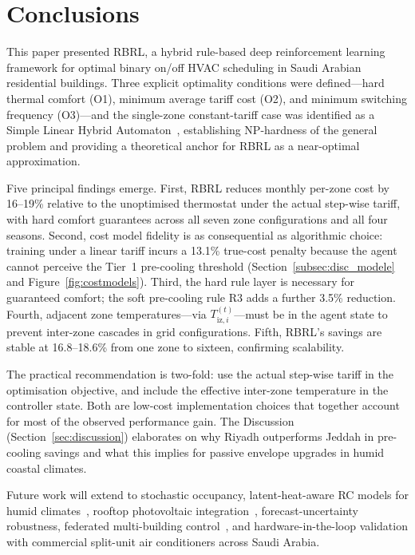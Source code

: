 \documentclass[12pt,a4paper]{article}
\let\oldsection\section
\renewcommand{\section}[1]{\FloatBarrier\oldsection{#1}}
\newcommand{\Tiz}[1]{T_{\mathrm{iz},#1}}
\begin{document}
\section{Conclusions}
\label{sec:conclusion}

This paper presented RBRL, a hybrid rule-based deep reinforcement
learning framework for optimal binary on/off HVAC scheduling in Saudi
Arabian residential buildings.
Three explicit optimality conditions were defined---hard thermal comfort
(O1), minimum average tariff cost (O2), and minimum switching frequency
(O3)---and the single-zone constant-tariff case was identified as a
Simple Linear Hybrid Automaton~\cite{Mousa2018}, establishing NP-hardness
of the general problem and providing a theoretical anchor for RBRL as a
near-optimal approximation.

Five principal findings emerge.
First, RBRL reduces monthly per-zone cost by 16--19\% relative to
the unoptimised thermostat under the actual step-wise tariff, with hard
comfort guarantees across all seven zone configurations and all four
seasons.
Second, cost model fidelity is as consequential as algorithmic choice:
training under a linear tariff incurs a 13.1\% true-cost penalty because
the agent cannot perceive the Tier~1 pre-cooling threshold
(Section~\ref{subsec:disc_modele} and Figure~\ref{fig:costmodels}).
Third, the hard rule layer is necessary for guaranteed comfort; the soft
pre-cooling rule R3 adds a further 3.5\% reduction.
Fourth, adjacent zone temperatures---via $\Tiz{i}^{(t)}$---must be in
the agent state to prevent inter-zone cascades in grid configurations.
Fifth, RBRL's savings are stable at 16.8--18.6\% from one zone to
sixteen, confirming scalability.

The practical recommendation is two-fold: use the actual step-wise
tariff in the optimisation objective, and include the effective
inter-zone temperature in the controller state.
Both are low-cost implementation choices that together account for most
of the observed performance gain.
The Discussion (Section~\ref{sec:discussion}) elaborates on why
Riyadh outperforms Jeddah in pre-cooling savings and what this implies
for passive envelope upgrades in humid coastal climates.

Future work will extend to stochastic occupancy, latent-heat-aware RC
models for humid climates~\cite{Rodrigues2025}, rooftop photovoltaic
integration~\cite{Alotaibi2024}, forecast-uncertainty robustness,
federated multi-building control~\cite{Xue2025,Yu2021}, and
hardware-in-the-loop validation with commercial split-unit air
conditioners across Saudi Arabia.
\end{document}
